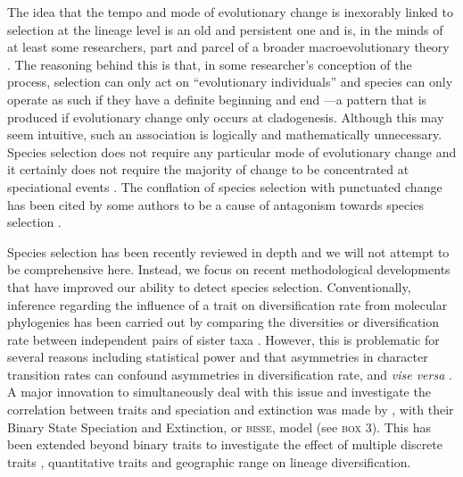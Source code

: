 The idea that the tempo and mode of evolutionary change is inexorably linked to selection at the lineage level is an old and persistent one and is, in the minds of at least some researchers, part and parcel of a broader macroevolutionary theory \citep{Stanley1975, Stanley1979, GouldEldredge1977, Gould1980, Charlesworth1982, Dennett1995, Levinton2001, Gould2002}. The reasoning behind this is that, in some researcher's conception of the process, selection can only act on ``evolutionary individuals'' \citep{Hull1980} and species can only operate as such if they have a definite beginning and end \citep{GouldEldredge1977, Gould2002}---a pattern that is produced if evolutionary change only occurs at cladogenesis. Although this may seem intuitive, such an association is logically and mathematically unnecessary. Species selection does not require any particular mode of evolutionary change and it certainly does not require the majority of change to be concentrated at speciational events \citep{VanValen1975, Bookstein1978, Slatkin1981, ArnoldFristrup1982, Rice1995, McShea2004, Rice2004, Okasha2006, Jablonski2008, Simpson2013}. The conflation of species selection with punctuated change has been cited by some authors to be a cause of antagonism towards species selection \citep{Turner2010, FitzJohnthesis}.

Species selection has been recently reviewed in depth \citep{Jablonski2008, RaboskyMcCune2010} and we will not attempt to be comprehensive here. Instead, we focus on recent methodological developments that have improved our ability to detect species selection. Conventionally, inference regarding the influence of a trait on diversification rate from molecular phylogenies has been carried out by comparing the diversities or diversification rate between independent pairs of sister taxa \citep{Mitter1988, Sargent2004, Vamosi2004, RaboskyMcCune2010}. However, this is problematic for several reasons including statistical power \citep{Slowinski1989, Slowinski1993, VamosiVamosi} and that asymmetries in character transition rates can confound asymmetries in diversification rate, and \emph{vise versa} \citep{Maddison2006}. A major innovation to simultaneously deal with this issue and investigate the correlation between traits and speciation and extinction was made by \citet{Maddison2007}, with their Binary State Speciation and Extinction, or \textsc{bisse}, model (see \textsc{box 3}). This has been extended beyond binary traits to investigate the effect of multiple discrete traits \citep[\textsc{musse};][]{FitzJohn2012}, quantitative traits \citep[\textsc{quasse};][]{FitzJohn2010} and geographic range \citep[\textsc{geosse};][]{Goldberg2011} on lineage diversification. 

